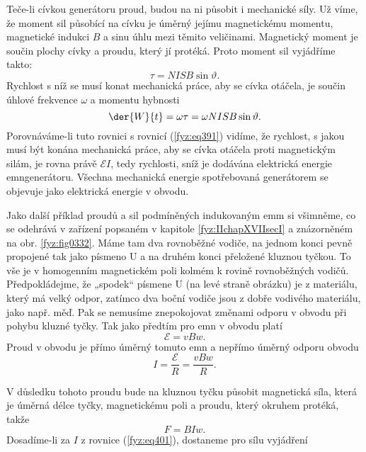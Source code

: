  Teče-li cívkou generátoru proud, budou na ni působit i mechanické síly. Už víme, že moment sil 
  působící na cívku je úměrný jejímu magnetickému momentu, magnetické indukci \(B\) a sinu úhlu 
  mezi těmito veličinami. Magnetický moment je součin plochy cívky a proudu, který jí protéká. 
  Proto moment sil vyjádříme takto:
  \begin{equation}\label{fyz:eq398}
    \tau = NISB\sin\vartheta.
  \end{equation}
  Rychlost s níž se musí konat mechanická práce, aby se cívka otáčela, je součin úhlové frekvence 
  \(\omega\) a momentu hybnosti
  \begin{equation}\label{fyz:eq399}
    \der{W}{t} = \omega\tau = \omega NISB\sin\vartheta.
  \end{equation}
  Porovnáváme-li tuto rovnici s rovnicí (\ref{fyz:eq391}) vidíme, že rychlost, s jakou musí být 
  konána mechanická práce, aby se cívka otáčela proti magnetickým silám, je rovna právě 
  \(\mathscr{E}I\), tedy rychlosti, sníž je dodávána elektrická energie emngenerátoru. Všechna 
  mechanická energie spotřebovaná generátorem se objevuje jako elektrická energie v obvodu.
 
  Jako další příklad proudů a sil podmíněných indukovaným emm si všimněme, co se odehrává
  v zařízení popsaném v kapitole \ref{fyz:IIchapXVIIsecI} a znázorněném na obr. \ref{fyz:fig0332}. 
  Máme tam dva rovnoběžné vodiče, na jednom konci pevně propojené tak jako písmeno U a na druhém 
  konci přeložené kluznou tyčkou. To vše je v homogenním magnetickém poli kolmém k rovině 
  rovnoběžných vodičů. Předpokládejme, že „spodek“ písmene U (na levé straně obrázku) je z 
  materiálu, který má velký odpor, zatímco dva boční vodiče jsou z dobře vodivého materiálu, jako 
  např. měď. Pak se nemusíme znepokojovat změnami odporu v obvodu při pohybu kluzné tyčky. Tak jako 
  předtím pro emn v obvodu platí
  \begin{equation}\label{fyz:eq400}
    \mathscr{E} = vBw.
  \end{equation}
  Proud v obvodu je přímo úměrný tomuto emn a nepřímo úměrný odporu obvodu
  \begin{equation}\label{fyz:eq401}
    I = \frac{\mathscr{E}}{R} = \frac{vBw}{R}.
  \end{equation}
  
  V důsledku tohoto proudu bude na kluznou tyčku působit magnetická síla, která je úměrná délce 
  tyčky, magnetickému poli a proudu, který okruhem protéká, takže
  \begin{equation}\label{fyz:eq402}
    F = BIw.
  \end{equation}
  Dosadíme-li za \(I\) z rovnice (\ref{fyz:eq401}), dostaneme pro sílu vyjádření
  
